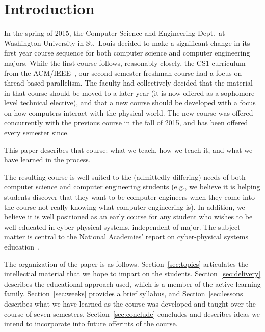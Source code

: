 \section{Introduction}
\label{sec:intro}

In the spring of 2015, the Computer Science and Engineering Dept.~at
Washington University in St.~Louis decided to make a significant change
in its first year course sequence for both computer science and
computer engineering majors.  While the first course follows, reasonably
closely, the CS1 curriculum from the ACM/IEEE~\cite{cs13}, our second semester
freshman course had a focus on thread-based parallelism.  The faculty
had collectively decided that the material in that course should be moved
to a later year (it is now offered as a sophomore-level technical elective),
and that a new course should be developed with a focus on how computers
interact with the physical world.
The new course was offered concurrently with the previous course in the
fall of 2015, and has been offered every semester since.

This paper describes that course: what we teach, how we teach it, and
what we have learned in the process.

The resulting course is well suited to the (admittedly differing) needs of
both computer science and computer
engineering students (e.g., we believe it is helping students discover
that they want to be computer engineers when they come into the course
not really knowing what computer engineering is).
In addition, we believe it is well positioned as an early course for
any student who wishes to be well educated in cyber-physical systems,
independent of major.
The subject matter is central to the National Academies' report on
cyber-physical systems education~\cite{nasem16}.

The organization of the paper is as follows.  Section~\ref{sec:topics}
articulates the intellectial material that we hope to impart on the
students.  
Section~\ref{sec:delivery} describes the educational approach used,
which is a member of the active learning family.
Section~\ref{sec:weeks} provides a brief syllabus, and
Section~\ref{sec:lessons} describes what we have learned as the course
was developed and taught over the course of seven semesters.
Section~\ref{sec:conclude} concludes and describes ideas we intend
to incorporate into future offerints of the course.
